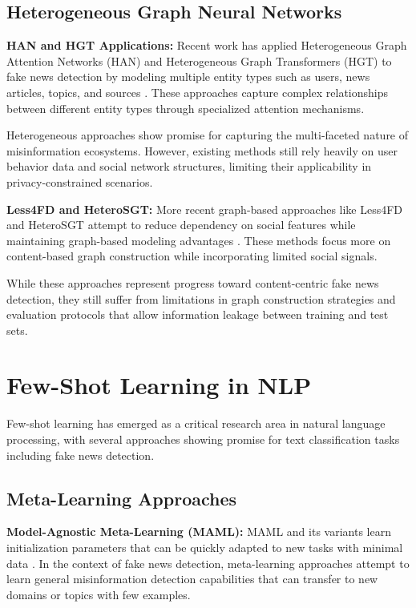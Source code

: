 \subsection{Heterogeneous Graph Neural Networks}

\textbf{HAN and HGT Applications:} Recent work has applied Heterogeneous Graph Attention Networks (HAN) and Heterogeneous Graph Transformers (HGT) to fake news detection by modeling multiple entity types such as users, news articles, topics, and sources \cite{dou2021user, lu2020gcan}. These approaches capture complex relationships between different entity types through specialized attention mechanisms.

Heterogeneous approaches show promise for capturing the multi-faceted nature of misinformation ecosystems. However, existing methods still rely heavily on user behavior data and social network structures, limiting their applicability in privacy-constrained scenarios.

\textbf{Less4FD and HeteroSGT:} More recent graph-based approaches like Less4FD and HeteroSGT attempt to reduce dependency on social features while maintaining graph-based modeling advantages \cite{less4fd2023, heterosgt2023}. These methods focus more on content-based graph construction while incorporating limited social signals.

While these approaches represent progress toward content-centric fake news detection, they still suffer from limitations in graph construction strategies and evaluation protocols that allow information leakage between training and test sets.

\section{Few-Shot Learning in NLP}

Few-shot learning has emerged as a critical research area in natural language processing, with several approaches showing promise for text classification tasks including fake news detection.

\subsection{Meta-Learning Approaches}

\textbf{Model-Agnostic Meta-Learning (MAML):} MAML and its variants learn initialization parameters that can be quickly adapted to new tasks with minimal data \cite{finn2017model, bansal2020self}. In the context of fake news detection, meta-learning approaches attempt to learn general misinformation detection capabilities that can transfer to new domains or topics with few examples.


